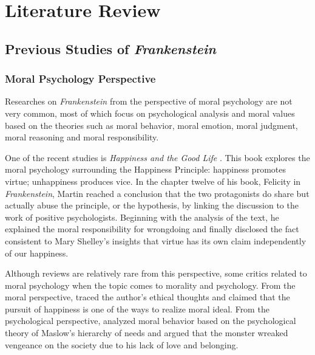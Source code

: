 \chapter{Literature Review} %
\label{cha:literature_review}
\section{Previous Studies of \textit{Frankenstein}} %
\label{sec:previous_studies_of_frankenstein}
\subsection{Moral Psychology Perspective} %
\label{sub:moral_psychology_perspective}
\begin{text}

Researches on \textit{Frankenstein} from the perspective of moral psychology are not very common, most of which focus on psychological analysis and moral values based on the theories such as moral behavior, moral emotion, moral judgment, moral reasoning and moral responsibility.

One of the recent studies is \textit{Happiness and the Good Life} \citep{martin2012happiness}. This book explores the moral psychology surrounding the Happiness Principle: happiness promotes virtue; unhappiness produces vice. In the chapter twelve of his book, Felicity in \textit{Frankenstein}, Martin reached a conclusion that the two protagonists do share but actually abuse the principle, or the hypothesis, by linking the discussion to the work of positive psychologists. Beginning with the analysis of the text, he explained the moral responsibility for wrongdoing and finally disclosed the fact consistent to Mary Shelley's insights that virtue has its own claim independently of our happiness.

Although reviews are relatively rare from this perspective, some critics related to moral psychology when the topic comes to morality and psychology. From the moral perspective,  traced the author's ethical thoughts and claimed that the pursuit of happiness is one of the ways to realize moral ideal. From the psychological perspective,  analyzed moral behavior based on the psychological theory of Maslow's hierarchy of needs and argued that the monster wreaked vengeance on the society due to his lack of love and belonging.

\end{text}
